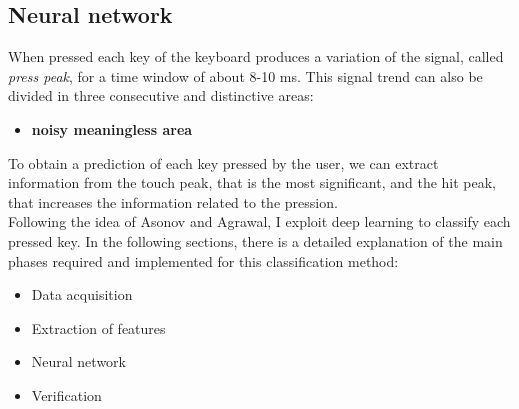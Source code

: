 \subsection{Neural network}
When pressed each key of the keyboard produces a variation of the signal, called \textit{press peak}, for a time window of about 8-10 ms\cite{keyboard_acoustic}. This signal trend can also be divided in three consecutive and distinctive areas:
\begin{itemize}
\item{\textbf{noisy meaningless area}}
\end{itemize}
To obtain a prediction of each key pressed by the user, we can extract information from the touch peak, that is the most significant, and the hit peak, that increases the information related to the pression.\\
Following the idea of Asonov and Agrawal, I exploit deep learning to classify each pressed key. In the following sections, there is a detailed explanation of the main phases required and implemented for this classification method:
\begin{itemize}
\item{Data acquisition}
\item{Extraction of features}
\item{Neural network}
\item{Verification}
\end{itemize}

